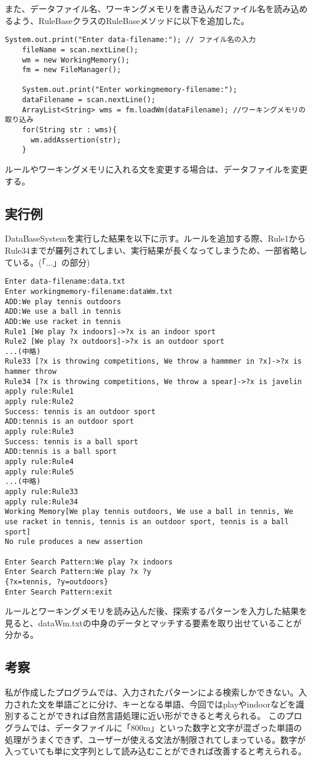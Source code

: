 \documentclass[a4j]{jarticle}
\begin{document}
また、データファイル名、ワーキングメモリを書き込んだファイル名を読み込めるよう、RuleBaseクラスのRuleBaseメソッドに以下を追加した。
\begin{lstlisting}[caption=RuleBaseメソッド]
    System.out.print("Enter data-filename:"); // ファイル名の入力
    fileName = scan.nextLine();
    wm = new WorkingMemory();
    fm = new FileManager();

    System.out.print("Enter workingmemory-filename:");
    dataFilename = scan.nextLine();
    ArrayList<String> wms = fm.loadWm(dataFilename); //ワーキングメモリの取り込み
    for(String str : wms){
      wm.addAssertion(str);
    }
\end{lstlisting}
ルールやワーキングメモリに入れる文を変更する場合は、データファイルを変更する。

\subsection{実行例}
DataBaseSystemを実行した結果を以下に示す。ルールを追加する際、Rule1からRule34までが羅列されてしまい、実行結果が長くなってしまうため、一部省略している。(「...」の部分)
\begin{lstlisting}
Enter data-filename:data.txt
Enter workingmemory-filename:dataWm.txt
ADD:We play tennis outdoors
ADD:We use a ball in tennis
ADD:We use racket in tennis
Rule1 [We play ?x indoors]->?x is an indoor sport
Rule2 [We play ?x outdoors]->?x is an outdoor sport
...(中略)
Rule33 [?x is throwing competitions, We throw a hammmer in ?x]->?x is hammer throw
Rule34 [?x is throwing competitions, We throw a spear]->?x is javelin
apply rule:Rule1
apply rule:Rule2
Success: tennis is an outdoor sport
ADD:tennis is an outdoor sport
apply rule:Rule3
Success: tennis is a ball sport
ADD:tennis is a ball sport
apply rule:Rule4
apply rule:Rule5
...(中略)
apply rule:Rule33
apply rule:Rule34
Working Memory[We play tennis outdoors, We use a ball in tennis, We use racket in tennis, tennis is an outdoor sport, tennis is a ball sport]
No rule produces a new assertion

Enter Search Pattern:We play ?x indoors
Enter Search Pattern:We play ?x ?y
{?x=tennis, ?y=outdoors}
Enter Search Pattern:exit
\end{lstlisting}
ルールとワーキングメモリを読み込んだ後、探索するパターンを入力した結果を見ると、dataWm.txtの中身のデータとマッチする要素を取り出せていることが分かる。
\subsection{考察}
私が作成したプログラムでは、入力されたパターンによる検索しかできない。入力された文を単語ごとに分け、キーとなる単語、今回ではplayやindoorなどを識別することができれば自然言語処理に近い形ができると考えられる。
このプログラムでは、データファイルに「800m」といった数字と文字が混ざった単語の処理がうまくできず、ユーザーが使える文法が制限されてしまっている。数字が入っていても単に文字列として読み込むことができれば改善すると考えられる。
\end{document}
